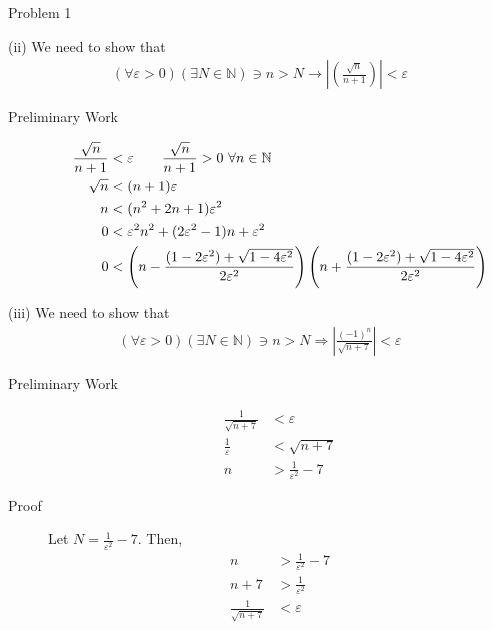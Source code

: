 \documentclass[10pt]{extarticle}
\newcommand{\N}{\mathbb{N}}
\begin{document}
\begin{problem}{Problem 1}
    \begin{problem}{(ii)}
      We need to show that
      \begin{align*}
        (\forall \varepsilon > 0)(\exists N\in \N) \ni n > N \rightarrow \left|\left(\frac{\sqrt{n}}{n + 1}\right)\right| < \varepsilon
      \end{align*}
      \begin{description}
        \item[Preliminary Work]
          \begin{align*}
            \frac{\sqrt n}{n + 1} &< \varepsilon \tag*{$\displaystyle \frac{\sqrt{n}}{n+1} > 0~\forall n\in\N$}\\
            \sqrt n &< (n+1)\varepsilon \\
            n &< (n^2 + 2n + 1)\varepsilon^2 \\
            0 &< \varepsilon^2 n^2 + (2\varepsilon^2-1) n + \varepsilon^2\\
            0 &< \left(n-\frac{(1-2\varepsilon^2) + \sqrt{1 - 4\varepsilon^2}}{2\varepsilon^2}\right)\left(n+\frac{(1-2\varepsilon^2) + \sqrt{1 - 4\varepsilon^2}}{2\varepsilon^2}\right)
          \end{align*}
      \end{description}
    \end{problem}
    \begin{problem}{(iii)}
      We need to show that
      \begin{align*}
        (\forall \varepsilon > 0)(\exists N \in \N) \ni n > N \Rightarrow \left|\frac{(-1)^n}{\sqrt{n+7}}\right| < \varepsilon
      \end{align*}
      \begin{description}
        \item[Preliminary Work]
          \begin{align*}
            \frac{1}{\sqrt{n+7}} &< \varepsilon\\
            \frac{1}{\varepsilon} & < \sqrt{n+7}\\
            n &> \frac{1}{\varepsilon^2} - 7 
          \end{align*}
        \item[Proof] Let $N = \displaystyle \frac{1}{\varepsilon^2}-7$. Then,
          \begin{align*}
            n &> \frac{1}{\varepsilon^2} - 7\\
            n + 7 &> \frac{1}{\varepsilon^2}\\
            \frac{1}{\sqrt{n+7}} & < \varepsilon\\

\end{align*}
\end{description}
\end{problem}
\end{problem}
\end{document}

